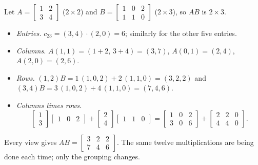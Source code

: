 \begin{example}\label{ex:u04-four-ways}
Let $A=\begin{bmatrix} 1 & 2\\ 3 & 4\end{bmatrix}$ ($2\times2$) and
$B=\begin{bmatrix} 1 & 0 & 2\\ 1 & 1 & 0\end{bmatrix}$ ($2\times3$), so $AB$ is $2\times3$.
\begin{itemize}
  \item \emph{Entries.} $c_{23}=(3,4)\cdot(2,0)=6$; similarly for the other five entries.
  \item \emph{Columns.} $A(1,1)=(1+2,\,3+4)=(3,7)$, $A(0,1)=(2,4)$, $A(2,0)=(2,6)$.
  \item \emph{Rows.} $(1,2)B=1\,(1,0,2)+2\,(1,1,0)=(3,2,2)$ and
    $(3,4)B=3\,(1,0,2)+4\,(1,1,0)=(7,4,6)$.
  \item \emph{Columns times rows.}
    \[
      \begin{bmatrix} 1\\ 3\end{bmatrix}\begin{bmatrix} 1 & 0 & 2\end{bmatrix}
      +\begin{bmatrix} 2\\ 4\end{bmatrix}\begin{bmatrix} 1 & 1 & 0\end{bmatrix}
      =\begin{bmatrix} 1 & 0 & 2\\ 3 & 0 & 6\end{bmatrix}
      +\begin{bmatrix} 2 & 2 & 0\\ 4 & 4 & 0\end{bmatrix}.
    \]
\end{itemize}
Every view gives $AB=\begin{bmatrix} 3 & 2 & 2\\ 7 & 4 & 6\end{bmatrix}$. The
same twelve multiplications are being done each time; only the grouping changes.
\end{example}


